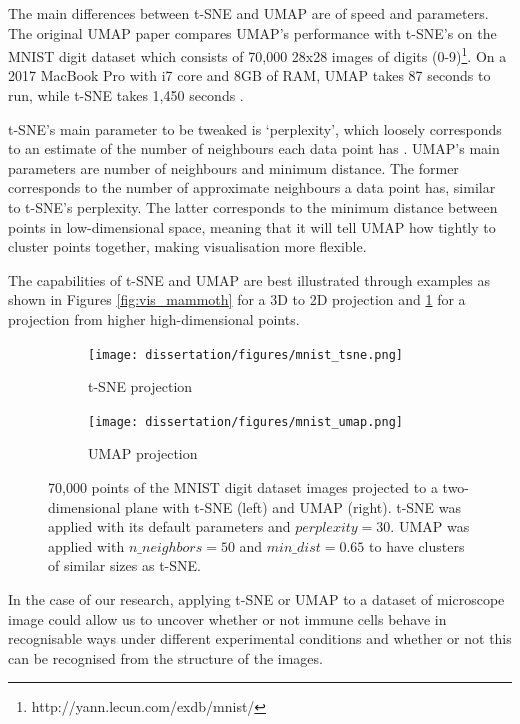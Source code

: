 The main differences between t-SNE and UMAP are of speed and parameters. The original UMAP paper compares UMAP's performance with t-SNE's on the MNIST digit dataset which consists of 70,000 28x28 images of digits (0-9)\footnote{http://yann.lecun.com/exdb/mnist/}. On a 2017 MacBook Pro with i7 core and 8GB of RAM, UMAP takes 87 seconds to run, while t-SNE takes 1,450 seconds \citep{umap_arxiv}.

t-SNE's main parameter to be tweaked is `perplexity', which loosely corresponds to an estimate of the number of neighbours each data point has \citep{wattenberg2016how}. UMAP's main parameters are number of neighbours and minimum distance. The former corresponds to the number of approximate neighbours a data point has, similar to t-SNE's perplexity. The latter corresponds to the minimum distance between points in low-dimensional space, meaning that it will tell UMAP how tightly to cluster points together, making visualisation more flexible.

The capabilities of t-SNE and UMAP are best illustrated through examples as shown in Figures \ref{fig:vis_mammoth} for a 3D to 2D projection and \ref{fig:vis_mnist} for a projection from higher high-dimensional points.

\begin{figure}[!ht]
    \centering
    \begin{subfigure}{.45\textwidth}
        \texttt{[image: dissertation/figures/mnist\_tsne.png]}
        \caption{t-SNE projection}
    \end{subfigure}
    \begin{subfigure}{.45\textwidth}
        \texttt{[image: dissertation/figures/mnist\_umap.png]}
        \caption{UMAP projection}
    \end{subfigure}
    \caption{70,000 points of the MNIST digit dataset images projected to a two-dimensional plane with t-SNE (left) and UMAP (right). t-SNE was applied with its default parameters and $perplexity=30$. UMAP was applied with $n\_neighbors=50$ and $min\_dist=0.65$ to have clusters of similar sizes as t-SNE.}
    \label{fig:vis_mnist}
\end{figure}

In the case of our research, applying t-SNE or UMAP to a dataset of microscope image could allow us to uncover whether or not immune cells behave in recognisable ways under different experimental conditions and whether or not this can be recognised from the structure of the images. %

